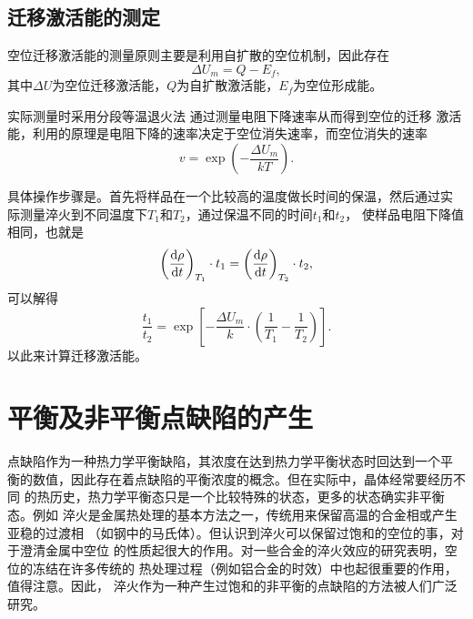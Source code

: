        \subsection{迁移激活能的测定}
            空位迁移激活能的测量原则主要是利用自扩散的空位机制，因此存在
            \begin{equation}
                \Delta U_m=Q-E_f,
            \end{equation}
            其中$\Delta U$为空位迁移激活能，$Q$为自扩散激活能，$E_f$为空位形成能。

            实际测量时采用分段等温退火法 通过测量电阻下降速率从而得到空位的迁移
            激活能，利用的原理是电阻下降的速率决定于空位消失速率，而空位消失的速率
            \begin{equation}
                v=\exp\left(- \frac{\Delta U_m}{kT} \right).
            \end{equation}

            具体操作步骤是。首先将样品在一个比较高的温度做长时间的保温，然后通过实
            际测量淬火到不同温度下$T_1$和$T_2$，通过保温不同的时间$t_1$和$t_2$，
            使样品电阻下降值相同，也就是
            \begin{equation}
                \left( \frac{\mathop{}\!\mathrm{d} \rho}{\mathop{}\!\mathrm{d} t} \right)_{T_1}\cdot t_1=\left( \frac{\mathop{}\!\mathrm{d} \rho}{\mathop{}\!\mathrm{d} t} \right)_{T_2}\cdot t_2,
            \end{equation}
            可以解得
            \begin{equation}
                \frac{t_1}{t_2}=\exp\left[ -\frac{\Delta U_m}{k}\cdot\left( \frac{1}{T_1}-\frac{1}{T_2} \right) \right].
            \end{equation}
            以此来计算迁移激活能。
    \section{平衡及非平衡点缺陷的产生}
        点缺陷作为一种热力学平衡缺陷，其浓度在达到热力学平衡状态时回达到一个平
        衡的数值，因此存在着点缺陷的平衡浓度的概念。但在实际中，晶体经常要经历不同
        的热历史，热力学平衡态只是一个比较特殊的状态，更多的状态确实非平衡态。例如
        淬火是金属热处理的基本方法之一，传统用来保留高温的合金相或产生亚稳的过渡相
        （如钢中的马氏体）。但认识到淬火可以保留过饱和的空位的事，对于澄清金属中空位
        的性质起很大的作用。对一些合金的淬火效应的研究表明，空位的冻结在许多传统的
        热处理过程（例如铝合金的时效）中也起很重要的作用，值得注意。因此，
        淬火作为一种产生过饱和的非平衡的点缺陷的方法被人们广泛研究。


